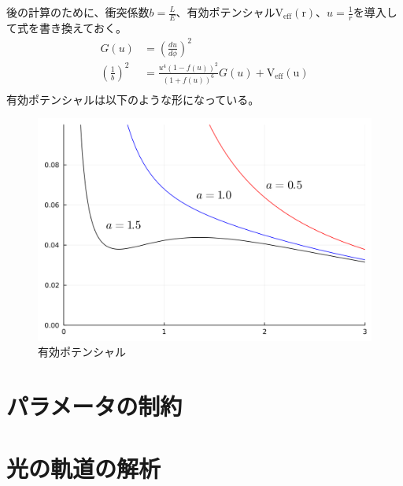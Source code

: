 \documentclass[dvipdfmx]{report} %
\begin{document}
後の計算のために、衝突係数$b = \frac{L}{E}$、有効ポテンシャル$\mathrm{V_{eff}(r)}$、$u=\frac{1}{r}$を導入して式を書き換えておく。
\begin{equation*}
\begin{split}
	G(u) 	&= \left( \frac{du}{d\phi} \right)^2\\ 
	\left( \frac{1}{b} \right)^2 &=
			\frac{u^4 (1-f(u))^2}{(1+f(u))^6} G(u)
			+ \mathrm{V_{eff}(u)}\\
\end{split}
\end{equation*}
有効ポテンシャルは以下のような形になっている。
\begin{figure}[H]
    \centering
    \includegraphics[width=0.5\columnwidth]{./images/buch/v-eff.png}
    \caption{有効ポテンシャル}
    \label{}
\end{figure}

\section{パラメータの制約}

\section{光の軌道の解析}
\end{document}
